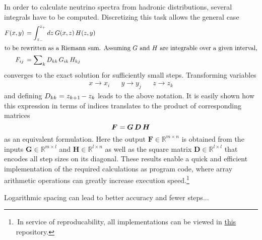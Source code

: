 In order to calculate neutrino spectra from hadronic distributions, several integrals have to be computed. Discretizing
this task allows the general case
\begin{align*}
	F(x, y) \kern+1.5pt &= \int_{z_{-}}^{z_{+}} dz \: G(x, z) \, H(z, y) \\
	\intertext{to be rewritten as a Riemann sum. Assuming $G$ and $H$ are integrable over a given interval,}
	F_{ij} \kern+1.8pt &= \sum\nolimits_k D_{kk} \, G_{ik} \, H_{kj}
\end{align*}
converges to the exact solution for sufficiently small steps. Transforming variables
\begin{align*}
	&&&& x \rightarrow x_i && y \rightarrow y_j && z \rightarrow z_k &&&&
\end{align*}
and defining $D_{kk} = z_{k+1} \kern-1.0pt - z_k$ leads to the above notation. It is easily shown how this expression in terms of
indices translates to the product of corresponding matrices
\begin{equation*}
	\bm{F} \kern+0.6pt = \bm{G} \, \bm{D} \, \bm{H}
\end{equation*}
as an equivalent formulation. Here the output $\bm{F} \in \mathbb{R}^{m \times n}$ is obtained from the inputs
$\bm{G} \in \mathbb{R}^{m \times l}$ and $\bm{H} \in \mathbb{R}^{l \times n}$ as well as the square matrix
$\bm{D} \in \mathbb{R}^{l \times l}$ that encodes all step sizes on its diagonal. These results enable a quick and
efficient implementation of the required calculations as program code, where array arithmetic operations can greatly
increase execution speed.\footnote{$\,$In service of reproducability, all implementations can be viewed in
\href{https://github.com/fritzali/bachelor}{this} repository.}

Logarithmic spacing can lead to better accuracy and fewer steps...
